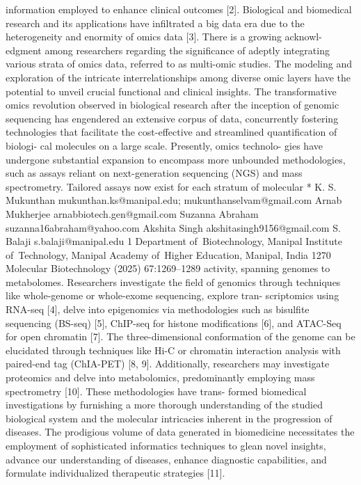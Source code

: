 information employed to enhance clinical outcomes [2].
Biological and biomedical research and its applications
have infiltrated a big data era due to the heterogeneity and
enormity of omics data [3]. There is a growing acknowl-
edgment among researchers regarding the significance of
adeptly integrating various strata of omics data, referred
to as multi-omic studies. The modeling and exploration of
the intricate interrelationships among diverse omic layers
have the potential to unveil crucial functional and clinical
insights. The transformative omics revolution observed
in biological research after the inception of genomic
sequencing has engendered an extensive corpus of data,
concurrently fostering technologies that facilitate the
cost-effective and streamlined quantification of biologi-
cal molecules on a large scale. Presently, omics technolo-
gies have undergone substantial expansion to encompass
more unbounded methodologies, such as assays reliant on
next-generation sequencing (NGS) and mass spectrometry.
Tailored assays now exist for each stratum of molecular
 *	 K. S. Mukunthan
mukunthan.ks@manipal.edu; mukunthanselvam@gmail.com
Arnab Mukherjee
arnabbiotech.gen@gmail.com
Suzanna Abraham
suzanna16abraham@yahoo.com
Akshita Singh
akshitasingh9156@gmail.com
S. Balaji
s.balaji@manipal.edu
1
Department of Biotechnology, Manipal Institute
of Technology, Manipal Academy of Higher Education,
Manipal, India
1270
Molecular Biotechnology (2025) 67:1269–1289
activity, spanning genomes to metabolomes. Researchers
investigate the field of genomics through techniques like
whole-genome or whole-exome sequencing, explore tran-
scriptomics using RNA-seq [4], delve into epigenomics via
methodologies such as bisulfite sequencing (BS-seq) [5],
ChIP-seq for histone modifications [6], and ATAC-Seq for
open chromatin [7]. The three-dimensional conformation
of the genome can be elucidated through techniques like
Hi-C or chromatin interaction analysis with paired-end tag
(ChIA-PET) [8, 9].
Additionally, researchers may investigate proteomics
and delve into metabolomics, predominantly employing
mass spectrometry [10]. These methodologies have trans-
formed biomedical investigations by furnishing a more
thorough understanding of the studied biological system
and the molecular intricacies inherent in the progression
of diseases. The prodigious volume of data generated in
biomedicine necessitates the employment of sophisticated
informatics techniques to glean novel insights, advance our
understanding of diseases, enhance diagnostic capabilities,
and formulate individualized therapeutic strategies [11].
